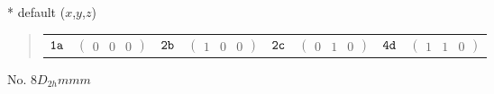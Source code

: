 \documentclass[fleqn,9pt,landscape]{jsarticle}
\begin{document}
* default ($x$,$y$,$z$)
\begin{quote}
\begin{tabular}{cccccccc}
$ {\tt 1a} $ & $ \begin{pmatrix} 0 & 0 & 0 \end{pmatrix} $ & $ {\tt 2b} $ & $ \begin{pmatrix} 1 & 0 & 0 \end{pmatrix} $ & $ {\tt 2c} $ & $ \begin{pmatrix} 0 & 1 & 0 \end{pmatrix} $ & $ {\tt 4d} $ & $ \begin{pmatrix} 1 & 1 & 0 \end{pmatrix} $
\end{tabular}
\end{quote}
\newpage
No. 8\quad$D_{2h}$\quad$mmm$\quad[ orthorhombic ]
\end{document}
